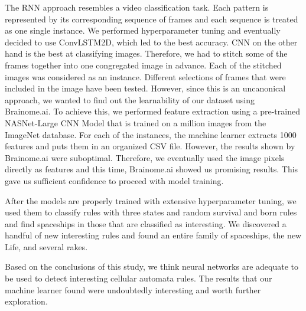 \documentclass[12pt]{article}
\numberwithin{figure}{section} %
\begin{document}
The RNN approach resembles a video classification task. Each pattern is represented by its corresponding sequence of frames and each sequence is treated as one single instance. We performed hyperparameter tuning and eventually decided to use ConvLSTM2D, which led to the best accuracy. CNN on the other hand is the best at classifying images. Therefore, we had to stitch some of the frames together into one congregated image in advance. Each of the stitched images was considered as an instance. Different selections of frames that were included in the image have been tested. However, since this is an uncanonical approach, we wanted to find out the learnability of our dataset using Brainome.ai. To achieve this, we performed feature extraction using a pre-trained NASNet-Large CNN Model that is trained on a million images from the ImageNet database. For each of the instances, the machine learner extracts 1000 features and puts them in an organized CSV file. However, the results shown by Brainome.ai were suboptimal. Therefore, we eventually used the image pixels directly as features and this time, Brainome.ai showed us promising results. This gave us sufficient confidence to proceed with model training. 

After the models are properly trained with extensive hyperparameter tuning, we used them to classify rules with three states and random survival and born rules and find spaceships in those that are classified as interesting. We discovered a handful of new interesting rules and found an entire family of spaceships, the new Life, and several rakes. 

Based on the conclusions of this study, we think neural networks are adequate to be used to detect interesting cellular automata rules. The results that our machine learner found were undoubtedly interesting and worth further exploration. 
\end{document}
